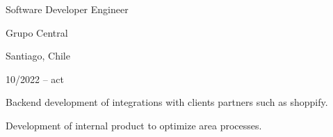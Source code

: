 \begin{cventries}

\cventry

{Software Developer Engineer} %

{Grupo Central} %

{Santiago, Chile} %

{10/2022 – act} %

{

  \begin{cvitems} %

    \item {Backend development of integrations with clients partners such as shoppify.}
    \item {Development of internal product to optimize area processes. } 

  \end{cvitems}

}


\end{cventries}
